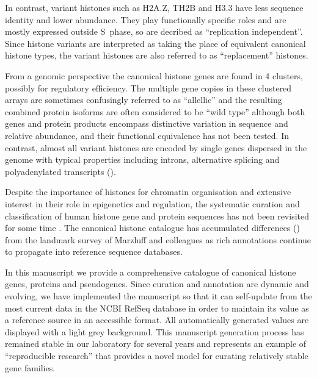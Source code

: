 	In contrast, variant histones such as H2A.Z, TH2B and H3.3 have 
	less sequence identity and lower abundance. 
	They play functionally specific roles and are mostly expressed outside S~phase, 
	so are decribed as ``replication independent''. 
	Since histone variants are interpreted as taking the place of equivalent canonical histone types, 
	the variant histones are also referred to as ``replacement'' histones.

	From a genomic perspective the canonical histone genes are found in 4 clusters, 
	possibly for regulatory efficiency. 
	The multiple gene copies in these clustered arrays are sometimes confusingly referred to as ``allellic'' 
	and the resulting combined protein isoforms are often considered to be ``wild type'' 
	although both genes and protein products encompass distinctive variation in sequence and relative abundance, 
	and their functional equivalence has not been tested.
	In contrast, almost all variant histones are encoded by single genes dispersed in the genome 
	with typical properties including introns, alternative splicing 
	and polyadenylated transcripts ().

	Despite the importance of histones for chromatin organisation and extensive interest
	in their role in epigenetics and regulation, the systematic curation and classification of human histone
	gene and protein sequences has not been revisited for some time \citep{Marzluff02}. 
	The canonical histone catalogue has accumulated 
	 differences ()
	from the landmark survey of Marzluff and colleagues \citep{Marzluff02} 
	as rich annotations continue to propagate into reference sequence databases.

	In this manuscript we provide a comprehensive catalogue
	of canonical histone genes, proteins and pseudogenes.
	Since curation and annotation are dynamic and evolving,
	we have implemented the manuscript so that it can 
	self-update from the most current data in the NCBI RefSeq database 
	in order to maintain its value as a reference source in an accessible format.
	All automatically generated values are displayed with a light grey background.
	This manuscript generation process has remained stable in our laboratory for several years
	and represents an example of ``reproducible research'' \citep{Claerbout2000}
	that provides a novel model for curating relatively stable gene families.

